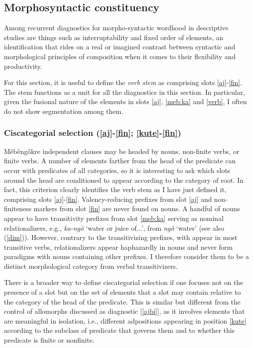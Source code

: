 \documentclass[output=paper]{langscibook}
\begin{document}
\subsection{Morphosyntactic constituency}
\label{ms-const}

Among recurrent diagnostics for morpho-syntactic wordhood in descriptive studies are things such as interruptability and fixed order of elements, an identification that rides on a real or imagined contrast between syntactic and morphological principles of composition when it comes to their flexibility and productivity. %

For this section, it is useful to define the {\em verb stem} as comprising slots \ref{aj}-\ref{fin}. The stem functions as a unit for all the diagnostics in this section. In particular, given the fusional nature of the elements in slots \ref{aj}, \ref{meb:ka} and \ref{verb}, I often do not show segmentation among them.

\subsubsection{Ciscategorial selection (\ref{aj}-\ref{fin}; \ref{kute}-\ref{fin})}

Mẽbêngôkre independent clauses may be headed by nouns, non-finite verbs, or finite verbs. A number of elements farther from the head of the predicate can occur with predicates of all categories, so it is interesting to ask which slots around the head are conditioned to appear according to the category of root. In fact, this criterion clearly identifies the verb stem as I have just defined it, comprising slots \ref{aj}-\ref{fin}. Valency-reducing prefixes from slot \ref{aj} and non-finiteness markers from slot \ref{fin} are never found on nouns. A handful of nouns appear to have transitivity prefixes from slot \ref{meb:ka} serving as nominal relationalizers, e.g., {\em ka-ngô} `water or juice of...', from {\em ngô} `water' (see also (\ref{dim})). However, contrary to the transitivizing prefixes, with appear in most transitive verbs, relationalizers appear haphazardly in nouns and never form paradigms with nouns containing other prefixes. I therefore consider them to be a distinct morphological category from verbal transitivizers.


\largerpage
There is a broader way to define ciscategorial selection if one focuses not on the presence of a slot but on the set of elements that a slot may contain relative to the category of the head of the predicate. This is similar but different from the control of allomorphs discussed as diagnostic [\ref{ajbi}], as it involves elements that are meaningful in isolation, i.e., different adpositions appearing in position \ref{kute} according to the subclass of predicate that governs them and to whether this predicate is finite or nonfinite.
\end{document}
